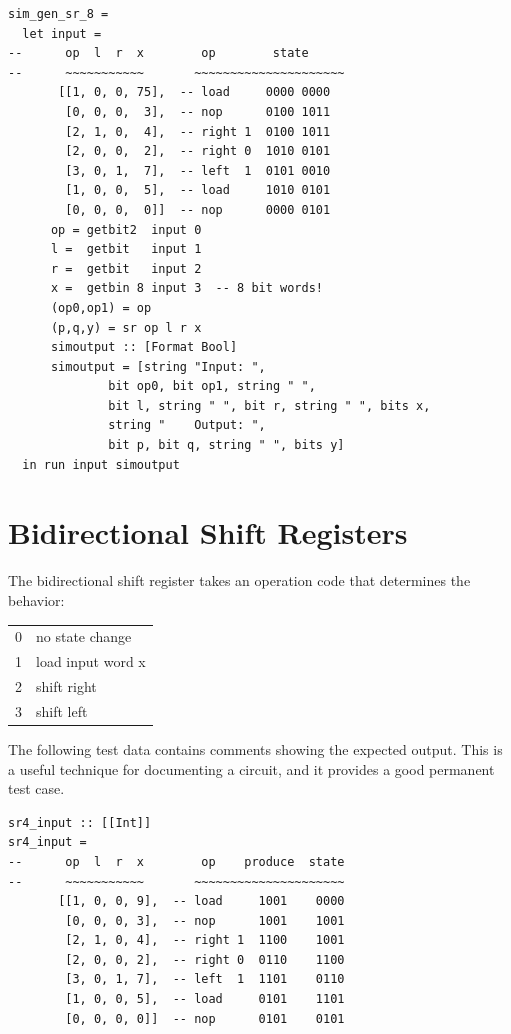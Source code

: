 \documentclass[a4paper,openany,fleqn]{book}
\begin{document}
\begin{verbatim}
sim_gen_sr_8 =
  let input =
--      op  l  r  x        op        state
--      ~~~~~~~~~~~       ~~~~~~~~~~~~~~~~~~~~~
       [[1, 0, 0, 75],  -- load     0000 0000
        [0, 0, 0,  3],  -- nop      0100 1011
        [2, 1, 0,  4],  -- right 1  0100 1011
        [2, 0, 0,  2],  -- right 0  1010 0101
        [3, 0, 1,  7],  -- left  1  0101 0010
        [1, 0, 0,  5],  -- load     1010 0101
        [0, 0, 0,  0]]  -- nop      0000 0101
      op = getbit2  input 0
      l =  getbit   input 1
      r =  getbit   input 2
      x =  getbin 8 input 3  -- 8 bit words!
      (op0,op1) = op
      (p,q,y) = sr op l r x
      simoutput :: [Format Bool]
      simoutput = [string "Input: ",
              bit op0, bit op1, string " ",
              bit l, string " ", bit r, string " ", bits x,
              string "    Output: ",
              bit p, bit q, string " ", bits y]
  in run input simoutput
\end{verbatim}

\section{Bidirectional Shift Registers}
\label{sec:bidir-shift-regist}

The bidirectional shift register takes an operation code that
determines the behavior:

\begin{tabular}{ll}
  0 & no state change \\
  1 & load input word x \\
  2 & shift right \\
  3 & shift left \\
\end{tabular}

The following test data contains comments showing the expected output.
This is a useful technique for documenting a circuit, and it provides
a good permanent test case.

\begin{verbatim}
sr4_input :: [[Int]]
sr4_input =
--      op  l  r  x        op    produce  state
--      ~~~~~~~~~~~       ~~~~~~~~~~~~~~~~~~~~~
       [[1, 0, 0, 9],  -- load     1001    0000
        [0, 0, 0, 3],  -- nop      1001    1001
        [2, 1, 0, 4],  -- right 1  1100    1001
        [2, 0, 0, 2],  -- right 0  0110    1100
        [3, 0, 1, 7],  -- left  1  1101    0110
        [1, 0, 0, 5],  -- load     0101    1101
        [0, 0, 0, 0]]  -- nop      0101    0101
\end{verbatim}
\end{document}
